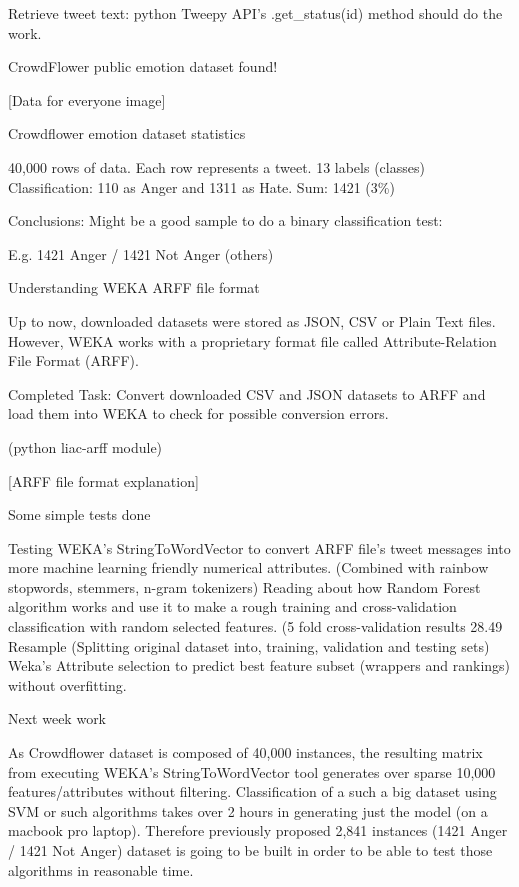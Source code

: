 Retrieve tweet text: python Tweepy\cite{Tweepy} API's .get\_status(id) method should do the work.

CrowdFlower public emotion dataset found!

[Data for everyone image]

Crowdflower emotion dataset statistics

40,000 rows of data.
Each row represents a tweet.
13 labels (classes)
Classification: 110 as Anger and 1311 as Hate. Sum: 1421 (3\%)

Conclusions:
Might be a good sample to do a binary classification test:

E.g. 1421 Anger / 1421 Not Anger (others)

Understanding WEKA ARFF file format

Up to now, downloaded datasets were stored as JSON, CSV or Plain Text files. However, WEKA works with a proprietary format file called Attribute-Relation File Format (ARFF).

Completed Task:
Convert downloaded CSV and JSON datasets to ARFF and load them into WEKA to check for possible conversion errors.

(python liac-arff module)

[ARFF file format explanation]

Some simple tests done

Testing WEKA's StringToWordVector to convert ARFF file's tweet messages into more machine learning friendly numerical attributes. (Combined with rainbow stopwords, stemmers, n-gram tokenizers)
Reading about how Random Forest algorithm works and use it to make a rough training and cross-validation classification with random selected features. (5 fold cross-validation results 28.49%
Resample (Splitting original dataset into, training, validation and testing sets)
Weka's Attribute selection to predict best feature subset (wrappers and rankings) without overfitting.

Next week work

As Crowdflower dataset is composed of 40,000 instances, the resulting matrix from executing WEKA's StringToWordVector tool generates over sparse 10,000 features/attributes without filtering.
Classification of a such a big dataset using SVM or such algorithms takes over 2 hours in generating just the model (on a macbook pro laptop).
Therefore previously proposed 2,841 instances (1421 Anger / 1421 Not Anger) dataset is going to be built in order to be able to test those algorithms in reasonable time.

